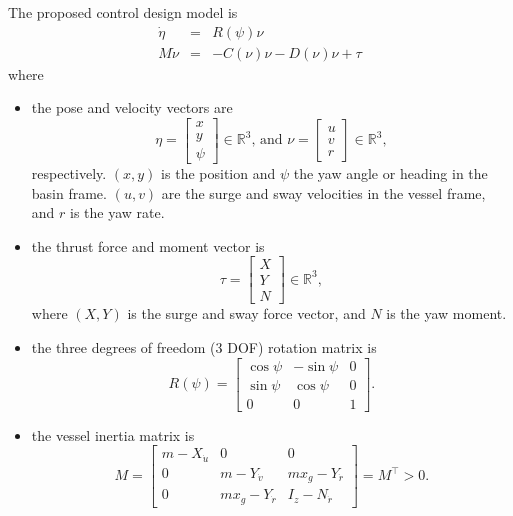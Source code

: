\documentclass[a4paper,twoside,english]{report}
\begin{document}
The proposed control design model is
\begin{eqnarray}
\dot{\eta} & = & R\left(\psi\right)\nu\label{eq: CSE1 kinematics-1}\\
M\dot{\nu} & = & -C\left(\nu\right)\nu-D\left(\nu\right)\nu+\tau\label{eq: CSE1 kinetics-1}
\end{eqnarray}
where
\begin{itemize}
\item the pose and velocity vectors are
\[
\eta=\left[\begin{array}{c}
x\\
y\\
\psi
\end{array}\right]\in\mathbb{R}^{3}\text{, and }\nu=\left[\begin{array}{c}
u\\
v\\
r
\end{array}\right]\in\mathbb{R}^{3},
\]
respectively. $\left(x,y\right)$ is the position and $\psi$ the
yaw angle or heading in the basin frame. $\left(u,v\right)$ are the
surge and sway velocities in the vessel frame, and $r$ is the yaw
rate.
\item the thrust force and moment vector is
\[
\tau=\left[\begin{array}{c}
X\\
Y\\
N
\end{array}\right]\in\mathbb{R}^{3},
\]
where $\left(X,Y\right)$ is the surge and sway force vector, and
$N$ is the yaw moment.
\item the three degrees of freedom (3 DOF) rotation matrix is
\[
R\left(\psi\right)=\left[\begin{array}{ccc}
\cos\psi & -\sin\psi & 0\\
\sin\psi & \cos\psi & 0\\
0 & 0 & 1
\end{array}\right].
\]
\item the vessel inertia matrix is
\[
M=\left[\begin{array}{ccc}
m-X_{\dot{u}} & 0 & 0\\
0 & m-Y_{\dot{v}} & mx_{g}-Y_{\dot{r}}\\
0 & mx_{g}-Y_{\dot{r}} & I_{z}-N_{\dot{r}}
\end{array}\right]=M^{\top}>0.
\]
 

\end{itemize}
\end{document}
